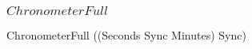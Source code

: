 \subsubsection{$ChronometerFull$}

\begin{circus}
  \circprocess ChronometerFull \circdef ((Seconds \lpar Sync \rpar Minutes) \circhide Sync)
\end{circus}
%
%
%
%
%

